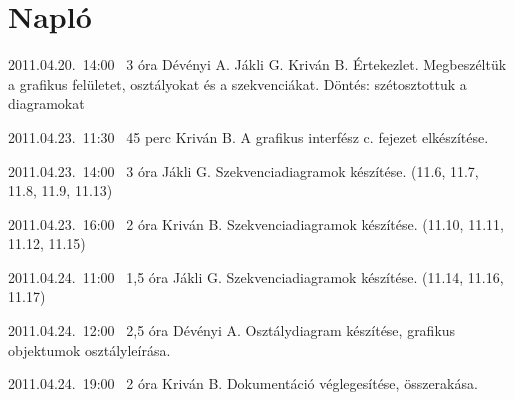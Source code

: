 %
\section{Napló}

\begin{naplo}

\bejegyzes
{2011.04.20.~14:00~} %
{3 óra} %
{Dévényi A.\newline
Jákli G.\newline
Kriván B.} %
{Értekezlet.\newline
Megbeszéltük a grafikus felületet, osztályokat és a szekvenciákat.
Döntés: szétosztottuk a diagramokat} %

\bejegyzes
{2011.04.23.~11:30~}
{45 perc}
{Kriván B.}
{A grafikus interfész c. fejezet elkészítése.}

\bejegyzes
{2011.04.23.~14:00~}
{3 óra}
{Jákli G.}
{Szekvenciadiagramok készítése. (11.6, 11.7, 11.8, 11.9, 11.13)}

\bejegyzes
{2011.04.23.~16:00~}
{2 óra}
{Kriván B.}
{Szekvenciadiagramok készítése. (11.10, 11.11, 11.12, 11.15)}

\bejegyzes
{2011.04.24.~11:00~}
{1,5 óra}
{Jákli G.}
{Szekvenciadiagramok készítése. (11.14, 11.16, 11.17)}

\bejegyzes
{2011.04.24.~12:00~}
{2,5 óra}
{Dévényi A.}
{Osztálydiagram készítése, grafikus objektumok osztályleírása.}

\bejegyzes
{2011.04.24.~19:00~}
{2 óra}
{Kriván B.}
{Dokumentáció véglegesítése, összerakása.}

\end{naplo}

